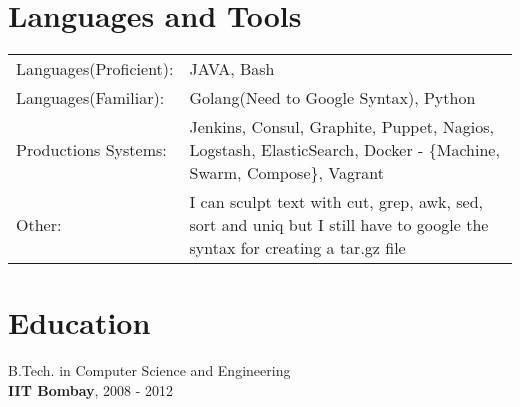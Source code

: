 \documentclass[margin]{res}
\begin{document}
\begin{resume}
\section{Languages and Tools}
   \begin{tabular}{l p{3in}}
    {Languages(Proficient):} & JAVA, Bash \\
    {Languages(Familiar):} &  Golang(Need to Google Syntax), Python  \\
    {Productions Systems:} &  Jenkins, Consul, Graphite, Puppet, Nagios, Logstash, ElasticSearch, Docker - \{Machine, Swarm, Compose\}, Vagrant \\
    {Other:} & I can sculpt text with cut, grep, awk, sed, sort and uniq but I still have to google the syntax for creating a tar.gz file \\

 \end{tabular}

\section{Education}
  B.Tech. in Computer Science and Engineering \\
  {\bf IIT Bombay}, 2008 - 2012 \\


\bigskip
\bigskip


\end{resume}
\end{document}
